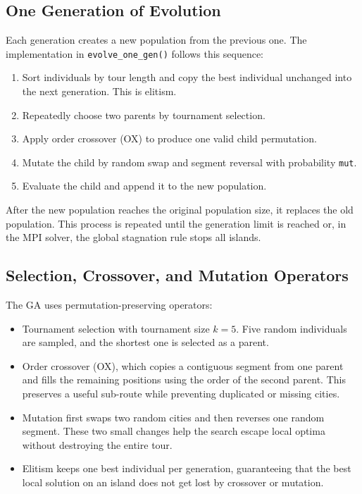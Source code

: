 \documentclass[11pt,a4paper]{article}
\begin{document}
\subsection{One Generation of Evolution}
Each generation creates a new population from the previous one. The
implementation in \texttt{evolve\_one\_gen()} follows this sequence:

\begin{enumerate}[leftmargin=*]
  \item Sort individuals by tour length and copy the best individual unchanged
  into the next generation. This is elitism.
  \item Repeatedly choose two parents by tournament selection.
  \item Apply order crossover (OX) to produce one valid child permutation.
  \item Mutate the child by random swap and segment reversal with probability
  \texttt{mut}.
  \item Evaluate the child and append it to the new population.
\end{enumerate}

After the new population reaches the original population size, it replaces the
old population. This process is repeated until the generation limit is reached
or, in the MPI solver, the global stagnation rule stops all islands.

\subsection{Selection, Crossover, and Mutation Operators}
The GA uses permutation-preserving operators:

\begin{itemize}[leftmargin=*]
  \item Tournament selection with tournament size $k=5$. Five random
  individuals are sampled, and the shortest one is selected as a parent.
  \item Order crossover (OX), which copies a contiguous segment from one parent
  and fills the remaining positions using the order of the second parent. This
  preserves a useful sub-route while preventing duplicated or missing cities.
  \item Mutation first swaps two random cities and then reverses one random
  segment. These two small changes help the search escape local optima without
  destroying the entire tour.
  \item Elitism keeps one best individual per generation, guaranteeing that the
  best local solution on an island does not get lost by crossover or mutation.
\end{itemize}
\end{document}
